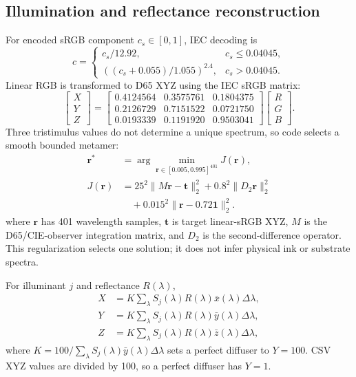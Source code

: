 \documentclass[journal]{IEEEtran}
\begin{document}
\subsection{Illumination and reflectance reconstruction}
For encoded sRGB component $c_s\in[0,1]$, IEC decoding is
\begin{equation}
c=\begin{cases}c_s/12.92,&c_s\leq0.04045,\\
((c_s+0.055)/1.055)^{2.4},&c_s>0.04045.\end{cases}
\end{equation}
Linear RGB is transformed to D65 XYZ using the IEC sRGB matrix:
\begin{equation}
\begin{bmatrix}X\\Y\\Z\end{bmatrix}=
\begin{bmatrix}
0.4124564&0.3575761&0.1804375\\
0.2126729&0.7151522&0.0721750\\
0.0193339&0.1191920&0.9503041
\end{bmatrix}
\begin{bmatrix}R\\G\\B\end{bmatrix}.
\end{equation}
Three tristimulus values do not determine a unique spectrum, so code selects a smooth bounded metamer:
\begin{align}
\mathbf r^*&=\arg\min_{\mathbf r\in[0.005,0.995]^{401}}J(\mathbf r),\\
J(\mathbf r)&=25^2\|M\mathbf r-\mathbf t\|_2^2
 +0.8^2\|D_2\mathbf r\|_2^2\nonumber\\
&\quad+0.015^2\|\mathbf r-0.72\mathbf 1\|_2^2.
\end{align}
where $\mathbf r$ has 401 wavelength samples, $\mathbf t$ is target linear-sRGB XYZ, $M$ is the D65/CIE-observer integration matrix, and $D_2$ is the second-difference operator. This regularization selects one solution; it does not infer physical ink or substrate spectra.


For illuminant $j$ and reflectance $R(\lambda)$,
\begin{align}
X&=K\sum_\lambda S_j(\lambda)R(\lambda)\bar x(\lambda)\Delta\lambda,\\
Y&=K\sum_\lambda S_j(\lambda)R(\lambda)\bar y(\lambda)\Delta\lambda,\\
Z&=K\sum_\lambda S_j(\lambda)R(\lambda)\bar z(\lambda)\Delta\lambda,
\end{align}
where $K=100/\sum_\lambda S_j(\lambda)\bar y(\lambda)\Delta\lambda$ sets a perfect diffuser to $Y=100$. CSV XYZ values are divided by 100, so a perfect diffuser has $Y=1$.
\end{document}
